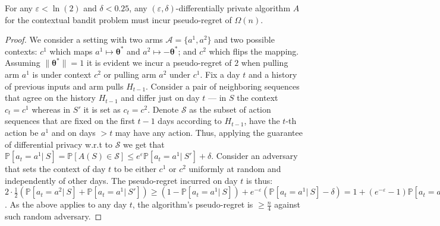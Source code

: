 \documentclass{article}
\renewcommand{\vec}[1]{\bm{#1}}
\renewcommand{\Pr}{\mathds{P}}
\newcommand{\A}{\mathcal{A}}
\begin{document}
\begin{claim}
\label{clm:standard_contextual_DP_implies_linear_regret}
For any $\varepsilon < \ln(2)$ and $\delta < 0.25$, any $(\varepsilon,\delta)$-differentially private algorithm $A$ for the contextual bandit problem must incur pseudo-regret of $\Omega(n)$.
\end{claim}
\begin{proof}
We consider a setting with two arms $\A=\{a^1,a^2\}$ and two possible contexts: $c^1$ which maps $a^1\mapsto \vec\theta^*$ and $a^2 \mapsto -\vec\theta^*$; and $c^2$ which flips the mapping. Assuming $\|\vec\theta^*\|=1$ it is evident we incur a pseudo-regret of $2$ when pulling arm $a^1$ is under context $c^2$ or pulling arm $a^2$ under $c^1$. Fix a day $t$ and a history of previous inputs and arm pulls $H_{t-1}$. Consider a pair of neighboring sequences that agree on the history $H_{t-1}$ and differ just on day $t$ --- in $S$ the context $c_t =c^1$ whereas in $S'$ it is set as $c_t =c^2$. Denote $\mathcal{S}$ as the subset of action sequences that are fixed on the first $t-1$ days according to $H_{t-1}$, have the $t$-th action be $a^1$ and on days $>t$ may have any action. Thus, applying the guarantee of differential privacy w.r.t to $\mathcal{S}$ we get that $\Pr[a_t = a^1 |~S] = \Pr[A(S)\in \mathcal{S}] \leq e^\varepsilon \Pr[a_t=a^1 |~S'] + \delta$. Consider an adversary that sets the context of day $t$ to be either $c^1$ or $c^2$ uniformly at random and independently of other days. The pseudo-regret incurred on day $t$ is thus: $2\cdot \tfrac 1 2 \left( \Pr[a_t=a^2|~S] + \Pr[a_t=a^1|~S'] \right)  \geq (1- \Pr[a_t=a^1|~S]) + e^{-\varepsilon}(\Pr[a_t=a^1|~S]-\delta) = 1 + (e^{-\varepsilon}-1)\Pr[a_t=a^2|~S] - \delta > 1 - 1\cdot \tfrac 1 2 - \tfrac 1 4 = \tfrac 1 4$. As the above applies to any day $t$,  the algorithm's pseudo-regret is $\geq \tfrac n 4$ against such random adversary.
\end{proof}
\end{document}
